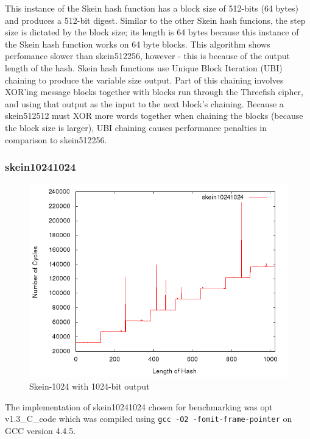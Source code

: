\documentclass[10pt,a4paper]{article}
\begin{document}
This instance of the Skein hash function has a block size of 512-bits (64 bytes) and produces a 512-bit digest.  Similar to the other Skein hash funcions, the step size is dictated by the block size; its length is 64 bytes because this instance of the Skein hash function works on 64 byte blocks.  This algorithm shows perfomance slower than skein512256, however - this is because of the output length of the hash.  Skein hash functions use Unique Block Iteration (UBI) chaining to produce the variable size output.  Part of this chaining involves XOR'ing message blocks together with blocks run through the Threefish cipher, and using that output as the input to the next block's chaining.  Because a skein512512 must XOR more words together when chaining the blocks (because the block size is larger), UBI chaining causes performance penalties in comparison to skein512256.

\subsubsection{skein10241024}
    \begin{figure}[H]
        \begin{center}
            \includegraphics[scale=0.5]{images/skein10241024.png} 
            \caption{Skein-1024 with 1024-bit output}
        \end{center}
    \end{figure}

The implementation of skein10241024 chosen for benchmarking was opt
v1.3\_C\_code which was compiled using \texttt{gcc -O2 -fomit-frame-pointer} on
GCC version 4.4.5.
\end{document}
